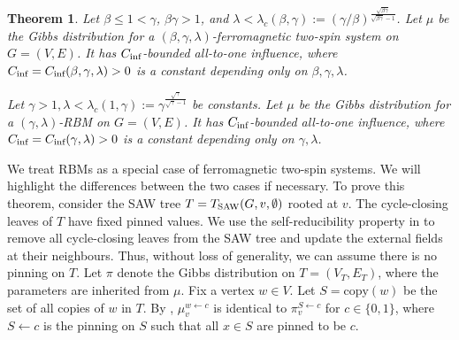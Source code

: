 \documentclass[11pt]{amsart}
\newcommand{\defeq}{:=}
\newtheorem{theorem}{Theorem}
\theoremstyle{definition}
\theoremstyle{remark}
\begin{document}
\begin{theorem}\label{thm:all-to-one-influence}
    Let $\beta \leq 1 < \gamma$, $\beta\gamma > 1$, and $\lambda < \lambda_c(\beta,\gamma) \defeq (\gamma/\beta)^{\frac{\sqrt{\beta \gamma}}{\sqrt{\beta \gamma}-1}}$. 
    Let $\mu$ be the Gibbs distribution for a $(\beta,\gamma,\lambda)$-ferromagnetic two-spin system on $G=(V,E)$.
    It has $C_{\textnormal{inf}}$-bounded all-to-one influence, where $C_{\textnormal{inf}} = C_{\textnormal{inf}}(\beta,\gamma,\lambda) > 0$ is a constant depending only on $\beta,\gamma,\lambda$.

    Let $\gamma > 1, \lambda < \lambda_c(1,\gamma) \defeq \gamma^{\frac{\sqrt{\gamma}}{{\sqrt{\gamma}-1}}} $ be constants.
    Let $\mu$ be the Gibbs distribution for a $(\gamma,\lambda)$-RBM on $G=(V,E)$.
    It has $C_{\textnormal{inf}}$-bounded all-to-one influence, where $C_{\textnormal{inf}} = C_{\textnormal{inf}}(\gamma,\lambda) > 0$ is a constant depending only on $\gamma,\lambda$.
\end{theorem}



We treat RBMs as a special case of ferromagnetic two-spin systems. We will highlight the differences between the two cases if necessary.
To prove this theorem, consider the SAW tree $T = T_{\textnormal{SAW}}(G,v,\emptyset)$ rooted at $v$. The cycle-closing leaves of $T$ have fixed pinned values. We use the self-reducibility property in  to remove all cycle-closing leaves from the SAW tree and update the external fields at their neighbours.
Thus, without loss of generality, we can assume there is no pinning on $T$. 
Let $\pi$ denote the Gibbs distribution on $T = (V_T,E_T)$, where the parameters are inherited from $\mu$. Fix a vertex $w \in V$. Let $S = \text{copy}(w)$ be the set of all copies of $w$ in $T$. By ,  $\mu_v^{w \gets c}$ is identical to $\pi_v^{S \gets c}$ for $c \in \{0,1\}$, where $S \gets c$ is the pinning on $S$ such that all $x \in S$ are pinned to be $c$.
\end{document}
